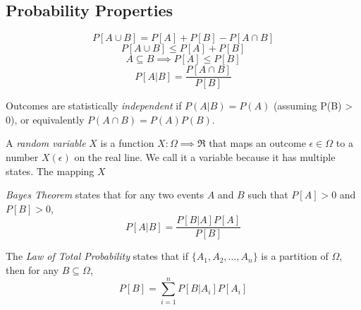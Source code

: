 \subsection{Probability Properties}
\begin{equation}
    P\left[A \cup B\right] = P\left[A\right] + P\left[B\right] - P\left[A \cap B\right]
\end{equation}
\begin{equation}
    P\left[A \cup B\right] \leq P\left[A\right] + P\left[B\right]
\end{equation}
\begin{equation}
    A \subseteq B \implies P\left[A\right] \leq P\left[B\right]
\end{equation}
\begin{equation}
    P\left[A | B\right] = \frac{P[A \cap B]}{P[B]}
\end{equation}

Outcomes are statistically \emph{independent} if
$P(A|B) = P(A)$ (assuming P(B) > 0), or
equivalently $P(A \cap B) = P(A)P(B)$.

A \emph{random variable} $X$ is a function $X : \Omega \implies \Re$
that maps an outcome $\epsilon \in \Omega$ to a number $X(\epsilon)$ on the real line.
We call it a variable because it has multiple states. The mapping $X$

\emph{Bayes Theorem} states that for any two events $A$ and $B$ such that $P[A] > 0$ and
$P[B] > 0$,
\begin{equation}
    P[A|B] = \frac{P[B|A]P[A]}{P[B]}
\end{equation}

The \emph{Law of Total Probability} states that if
$\{A_1, A_2, \dots, A_n\}$ is a partition of $\Omega$,
then for any $B \subseteq \Omega$,
\begin{equation}
    P[B] = \sum_{i = 1}^{n} P[B|A_i]P[A_i]
\end{equation}